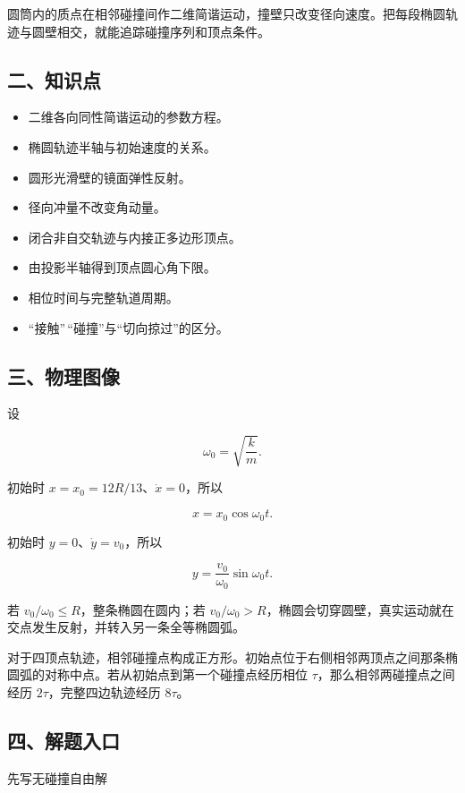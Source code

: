 \documentclass[12pt,a4paper,UTF8]{ctexart}
\newcommand{\tightlist}{\setlength{\itemsep}{0pt}\setlength{\parskip}{0pt}}
\begin{document}
圆筒内的质点在相邻碰撞间作二维简谐运动，撞壁只改变径向速度。把每段椭圆轨迹与圆壁相交，就能追踪碰撞序列和顶点条件。

\subsection{二、知识点}\label{ux4e8cux77e5ux8bc6ux70b9-4}

\begin{itemize}
\tightlist
\item
  二维各向同性简谐运动的参数方程。
\item
  椭圆轨迹半轴与初始速度的关系。
\item
  圆形光滑壁的镜面弹性反射。
\item
  径向冲量不改变角动量。
\item
  闭合非自交轨迹与内接正多边形顶点。
\item
  由投影半轴得到顶点圆心角下限。
\item
  相位时间与完整轨道周期。
\item
  ``接触''\,``碰撞''与``切向掠过''的区分。
\end{itemize}

\subsection{三、物理图像}\label{ux4e09ux7269ux7406ux56feux50cf-4}

设

\[\omega_0=\sqrt{\frac{k}{m}}.\]

初始时 \(x=x_0=12R/13\)、\(\dot x=0\)，所以

\[x=x_0\cos\omega_0t.\]

初始时 \(y=0\)、\(\dot y=v_0\)，所以

\[y=\frac{v_0}{\omega_0}\sin\omega_0t.\]

若 \(v_0/\omega_0\le R\)，整条椭圆在圆内；若
\(v_0/\omega_0>R\)，椭圆会切穿圆壁，真实运动就在交点发生反射，并转入另一条全等椭圆弧。

对于四顶点轨迹，相邻碰撞点构成正方形。初始点位于右侧相邻两顶点之间那条椭圆弧的对称中点。若从初始点到第一个碰撞点经历相位
\(\tau\)，那么相邻两碰撞点之间经历 \(2\tau\)，完整四边轨迹经历
\(8\tau\)。

\subsection{四、解题入口}\label{ux56dbux89e3ux9898ux5165ux53e3-4}

先写无碰撞自由解
\end{document}
